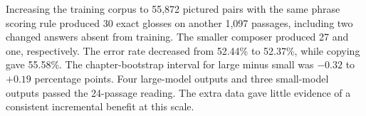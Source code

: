 Increasing the training corpus to 55,872 pictured pairs with the same phrase scoring rule produced 30 exact glosses on another 1,097 passages, including two changed answers absent from training. The smaller composer produced 27 and one, respectively. The error rate decreased from 52.44\% to 52.37\%, while copying gave 55.58\%. The chapter-bootstrap interval for large minus small was $-0.32$ to $+0.19$ percentage points. Four large-model outputs and three small-model outputs passed the 24-passage reading. The extra data gave little evidence of a consistent incremental benefit at this scale.
